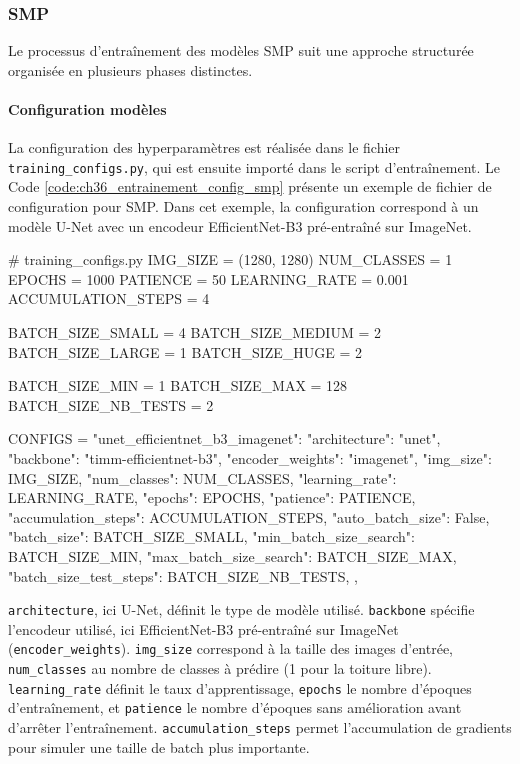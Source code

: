 \subsubsection{SMP}
Le processus d'entraînement des modèles SMP suit une approche structurée organisée en plusieurs phases distinctes.

\paragraph{Configuration modèles}
La configuration des hyperparamètres est réalisée dans le fichier \texttt{training\_configs.py}, qui est ensuite importé dans le script d'entraînement. Le Code \ref{code:ch36_entrainement_config_smp} présente un exemple de fichier de configuration pour SMP. Dans cet exemple, la configuration correspond à un modèle U-Net avec un encodeur EfficientNet-B3 pré-entraîné sur ImageNet.

\begin{code}[H]
    \begin{pythoncode}
    # training_configs.py
    IMG_SIZE = (1280, 1280)
    NUM_CLASSES = 1
    EPOCHS = 1000
    PATIENCE = 50
    LEARNING_RATE = 0.001
    ACCUMULATION_STEPS = 4

    BATCH_SIZE_SMALL = 4
    BATCH_SIZE_MEDIUM = 2
    BATCH_SIZE_LARGE = 1
    BATCH_SIZE_HUGE = 2

    BATCH_SIZE_MIN = 1
    BATCH_SIZE_MAX = 128
    BATCH_SIZE_NB_TESTS = 2

    CONFIGS = {
        "unet_efficientnet_b3_imagenet": {
            "architecture": "unet",
            "backbone": "timm-efficientnet-b3",
            "encoder_weights": "imagenet",
            "img_size": IMG_SIZE,
            "num_classes": NUM_CLASSES,
            "learning_rate": LEARNING_RATE,
            "epochs": EPOCHS,
            "patience": PATIENCE,
            "accumulation_steps": ACCUMULATION_STEPS,
            "auto_batch_size": False,
            "batch_size": BATCH_SIZE_SMALL,
            "min_batch_size_search": BATCH_SIZE_MIN,
            "max_batch_size_search": BATCH_SIZE_MAX,
            "batch_size_test_steps": BATCH_SIZE_NB_TESTS,
        },
    }
    \end{pythoncode}
    \caption{Exemple de fichier de configuration d'entraînement pour SMP}
    \label{code:ch36_entrainement_config_smp}
\end{code}

\texttt{architecture}, ici U-Net, définit le type de modèle utilisé. \texttt{backbone} spécifie l'encodeur utilisé, ici EfficientNet-B3 pré-entraîné sur ImageNet (\texttt{encoder\_weights}). \texttt{img\_size} correspond à la taille des images d'entrée, \texttt{num\_classes} au nombre de classes à prédire (1 pour la toiture libre). \texttt{learning\_rate} définit le taux d'apprentissage, \texttt{epochs} le nombre d'époques d'entraînement, et \texttt{patience} le nombre d'époques sans amélioration avant d'arrêter l'entraînement. \texttt{accumulation\_steps} permet l'accumulation de gradients pour simuler une taille de batch plus importante.

